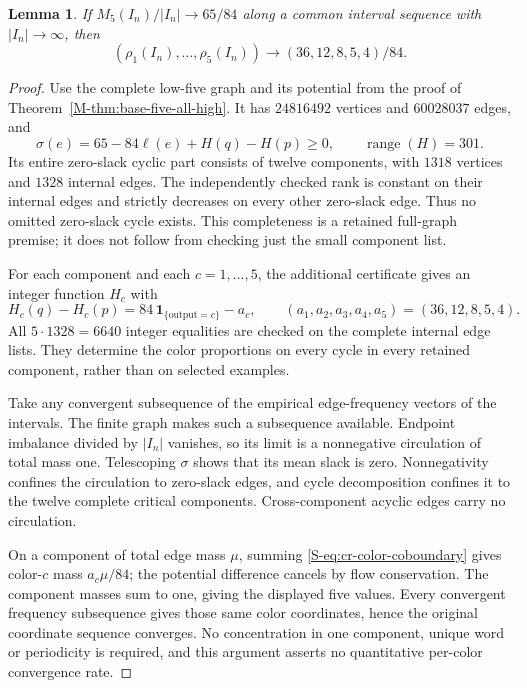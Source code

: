 \documentclass[11pt,reqno]{amsart}
\theoremstyle{plain}
\theoremstyle{plain}
\theoremstyle{plain}
\newtheorem{Slemma}[Stheorem]{Lemma}
\begin{document}
\begin{Slemma}\label{S-lem:cr-low-five-rigidity}
If $M_5(I_n)/|I_n|\to65/84$ along a common interval sequence with
$|I_n|\to\infty$, then
\[
 (\rho_1(I_n),\ldots,\rho_5(I_n))
       \longrightarrow(36,12,8,5,4)/84.
\]
\end{Slemma}
\begin{proof}
Use the complete low-five graph and its potential from the proof of
Theorem~\ref*{M-thm:base-five-all-high}. It has $24816492$ vertices and
$60028037$ edges, and
\[
 \sigma(e)=65-84\ell(e)+H(q)-H(p)\ge0,
 \qquad\operatorname{range}(H)=301.
\]
Its entire zero-slack cyclic part consists of twelve components,
with $1318$ vertices and $1328$ internal edges. The independently
checked rank is constant on their internal edges and strictly
decreases on every other zero-slack edge. Thus no omitted zero-slack
cycle exists. This completeness is a retained full-graph premise;
it does not follow from checking just the small component list.

For each component and each $c=1,\ldots,5$, the additional certificate
gives an integer function $H_c$ with
\begin{equation}\label{S-eq:cr-color-coboundary}
 H_c(q)-H_c(p)=84\,\mathbf1_{\{\text{output}=c\}}-a_c,
 \qquad(a_1,a_2,a_3,a_4,a_5)=(36,12,8,5,4).
\end{equation}
All $5\cdot1328=6640$ integer equalities are checked on the complete
internal edge lists. They determine the color proportions on every
cycle in every retained component, rather than on selected examples.

Take any convergent subsequence of the empirical edge-frequency
vectors of the intervals. The finite graph makes such a subsequence
available. Endpoint imbalance divided by $|I_n|$ vanishes, so its
limit is a nonnegative circulation of total mass one. Telescoping
$\sigma$ shows that its mean slack is zero. Nonnegativity confines
the circulation to zero-slack edges, and cycle decomposition confines
it to the twelve complete critical components. Cross-component
acyclic edges carry no circulation.

On a component of total edge mass $\mu$, summing
\eqref{S-eq:cr-color-coboundary} gives color-$c$ mass $a_c\mu/84$;
the potential difference cancels by flow conservation. The component
masses sum to one, giving the displayed five values. Every convergent
frequency subsequence gives those same color coordinates, hence the
original coordinate sequence converges. No concentration in one
component, unique word or periodicity is required, and this argument
asserts no quantitative per-color convergence rate.
\end{proof}
\end{document}
